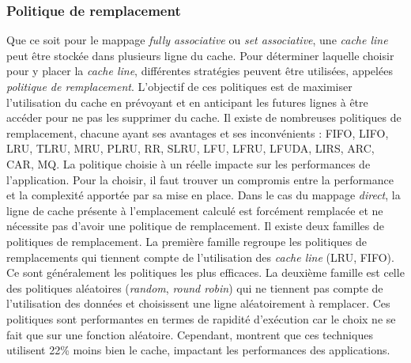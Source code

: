 



\subsubsection{Politique de remplacement}
Que ce soit pour le mappage \textit{fully associative} ou \textit{set associative}, une \textit{cache line} peut être stockée dans plusieurs ligne du cache. Pour déterminer laquelle choisir pour y placer la \textit{cache line}, différentes stratégies peuvent être utilisées, appelées \textit{politique de remplacement}. L'objectif de ces politiques est de maximiser l'utilisation du cache en prévoyant et en anticipant les futures lignes à être accéder pour ne pas les supprimer du cache. Il existe de nombreuses politiques de remplacement, chacune ayant ses avantages et ses inconvénients \cite{wikipedia2_2019}: FIFO, LIFO, LRU, TLRU, MRU, PLRU, RR, SLRU, LFU, LFRU, LFUDA, LIRS, ARC, CAR, MQ. La politique choisie à un réelle impacte sur les performances de l'application. Pour la choisir, il faut trouver un compromis entre la performance et la complexité apportée par sa mise en place. Dans le cas du mappage \textit{direct}, la ligne de cache présente à l'emplacement calculé est forcément remplacée et ne nécessite pas d'avoir une politique de remplacement. Il existe deux familles de politiques de remplacement. La première famille regroupe les politiques de remplacements qui tiennent compte de l'utilisation des \textit{cache line} (LRU, FIFO). Ce sont généralement les politiques les plus efficaces. La deuxième famille est celle des politiques aléatoires (\textit{random}, \textit{round robin}) qui ne tiennent pas compte de l'utilisation des données et choisissent une ligne aléatoirement à remplacer. Ces politiques sont performantes en termes de rapidité d'exécution car le choix ne se fait que sur une fonction aléatoire. Cependant, \cite{Al-Zoubi:2004:PEC:986537.986601} montrent que ces techniques utilisent 22\% moins bien le cache, impactant les performances des applications.


